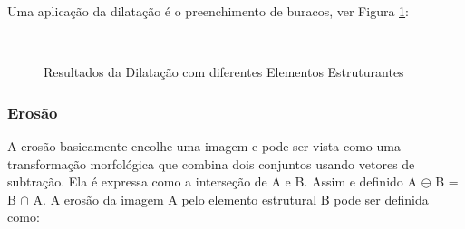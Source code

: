 \documentclass[letterpaper, 10 pt, conference]{ieeeconf}  %
\begin{document}
Uma aplicação da dilatação é o preenchimento de buracos, ver Figura
\ref{fig:Figura01}:

\begin{figure}[H] \centering

\\


\caption{Resultados da Dilatação com diferentes Elementos Estruturantes}
\label{fig:Figura01}
\end{figure}

\subsubsection{Erosão}

A erosão basicamente encolhe uma imagem e pode ser vista como uma transformação
morfológica que combina dois conjuntos usando vetores de subtração. Ela é
expressa como a interseção de A e B. Assim e definido A $\ominus$ B = B $\cap$
A. A erosão da imagem A pelo elemento estrutural B pode ser definida como:
\end{document}
